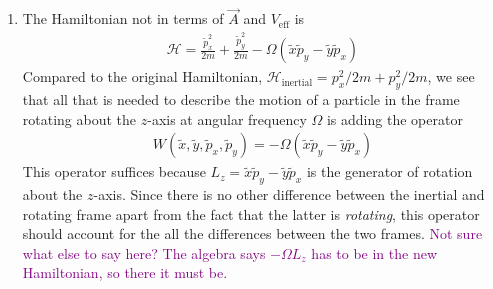 \documentclass{article}
\theoremstyle{definition}
\newcommand{\ham}{\mathcal{H}}
\newcommand{\f}[2]{\frac{#1}{#2}}
\begin{document}
\begin{enumerate}[label=\alph*)]
	\item The Hamiltonian not in terms of $\vec{A}$ and $V_\text{eff}$ is 
	\begin{align*}
		\ham = \f{\tilde{p}_x^2}{2m} +\f{\tilde{p}_y^2}{2m} - \Omega (\tilde{x}  \tilde{p}_y  -  \tilde{y} \tilde{p}_x)
	\end{align*}
	Compared to the original Hamiltonian, $\ham_\text{inertial} = p_x^2/2m + p_y^2/2m$, we see that all that is needed to describe the motion of a particle in the frame rotating about the $z$-axis at angular frequency $\Omega$ is adding the operator 
	\begin{align*}
		W(\tilde{x},\tilde{y}, \tilde{p}_x, \tilde{p}_y) = - \Omega (\tilde{x}  \tilde{p}_y  -  \tilde{y} \tilde{p}_x)
	\end{align*}
	This operator suffices because $L_z = \tilde{x}  \tilde{p}_y  -  \tilde{y} \tilde{p}_x$ is the generator of rotation about the $z$-axis. Since there is no other difference between the inertial and rotating frame apart from the fact that the latter is \textit{rotating}, this operator should account for the all the differences between the two frames. \textcolor{purple}{Not sure what else to say here? The algebra says $-\Omega L_z$ has to be in the new Hamiltonian, so there it must be.}
	

\end{enumerate}
\end{document}
